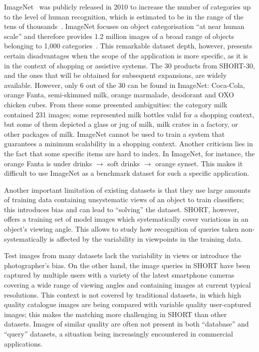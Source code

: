 ImageNet~\cite{Deng2009} was publicly released in 2010 to increase the number of categories up to the level of human recognition, which is estimated to be in the range of the tens of thousands~\cite{Biederman1987}. ImageNet focuses on object categorisation ``at near human scale'' and therefore provides 1.2 million images of a broad range of objects belonging to 1,000 categories~\cite{Feifei2007}. This remarkable dataset depth, however, presents certain disadvantages when the scope of the application is more specific, as it is in the context of shopping or assistive systems. The 30 products from SHORT-30, and the ones that will be obtained for subsequent expansions, are widely available. However, only 6 out of the 30 can be found in ImageNet: Coca-Cola, orange Fanta, semi-skimmed milk, orange marmalade, deodorant and OXO chicken cubes. From these some presented ambiguities: the category milk contained 231 images; some represented milk bottles valid for a shopping context, but some of them depicted a glass or jug of milk, milk crates in a factory, or other packages of milk. ImageNet cannot be used to train a system that guarantees a minimum scalability in a shopping context. Another criticism lies in the fact that some specific items are hard to index. In ImageNet, for instance, the orange Fanta is under drinks $\rightarrow$ soft drinks $\rightarrow$ orange synset. This makes it difficult to use ImageNet as a benchmark dataset for such a specific application.



Another important limitation of existing datasets is that they use large amounts of training data containing unsystematic views of an object to train classifiers; this introduces bias and can lead to ``solving'' the dataset. SHORT, however, offers a training set of model images which systematically cover variations in an object's viewing angle. This allows to study how recognition of queries taken non-systematically is affected by the variability in viewpoints in the training data.

Test images from many datasets lack the variability in views or introduce the photographer's bias. On the other hand, the image queries in SHORT have been captured by multiple users with a variety of the latest smartphone cameras covering a wide range of viewing angles and containing images at current typical resolutions. This context is not covered by traditional datasets, in which high quality catalogue images are being compared with variable quality user-captured images; this makes the matching more challenging in SHORT than other datasets. Images of similar quality are often not present in both ``database'' and ``query'' datasets, a situation being increasingly encountered in commercial applications.

